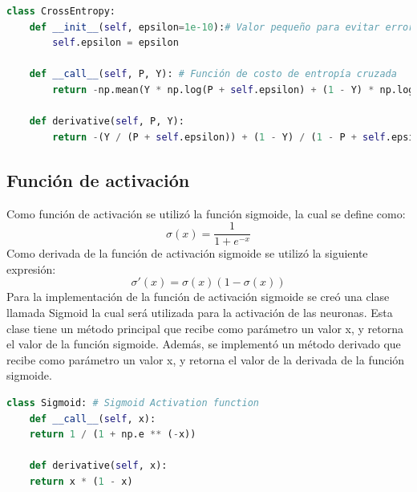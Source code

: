 \documentclass{article}
\begin{document}
    \begin{lstlisting}[language=Python, caption={Función de costo}, label={lst:cost_function}]
class CrossEntropy:
    def __init__(self, epsilon=1e-10):# Valor pequeño para evitar errores matemáticos
        self.epsilon = epsilon

    def __call__(self, P, Y): # Función de costo de entropía cruzada
        return -np.mean(Y * np.log(P + self.epsilon) + (1 - Y) * np.log(1 - P + self.epsilon))

    def derivative(self, P, Y):
        return -(Y / (P + self.epsilon)) + (1 - Y) / (1 - P + self.epsilon)
    \end{lstlisting}

    \subsection{Función de activación}\label{subsec:funcion-de-activacion}

    Como función de activación se utilizó la función sigmoide, la cual se define como:
    \begin{equation}
        \sigma(x) = \frac{1}{1 + e^{-x}}\label{eq:equation3}
    \end{equation}
    Como derivada de la función de activación sigmoide se utilizó la siguiente expresión:
    \begin{equation}
        \sigma'(x) = \sigma(x)(1 - \sigma(x))\label{eq:equation4}
    \end{equation}
    \noindent
    Para la implementación de la función de activación sigmoide se creó una clase llamada Sigmoid
    la cual será utilizada para la activación de las neuronas.
    Esta clase tiene un método principal que recibe como parámetro un valor x, y retorna el valor de la función sigmoide.
    Además, se implementó un método derivado que recibe como parámetro un valor x, y retorna el valor de la derivada de la función sigmoide.

    \begin{lstlisting}[language=Python, caption={Función de activación}, label={lst:activation_function}]
class Sigmoid: # Sigmoid Activation function
    def __call__(self, x):
    return 1 / (1 + np.e ** (-x))

    def derivative(self, x):
    return x * (1 - x)
    \end{lstlisting}
\end{document}
